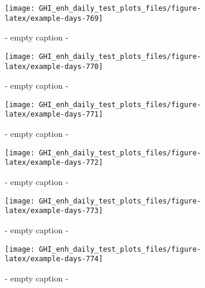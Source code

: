 \documentclass[
  10pt,
  a4paper,oneside]{article}
\begin{document}
\begin{figure}[H]

{\centering \texttt{[image: GHI\_enh\_daily\_test\_plots\_files/figure-latex/example-days-769]} 

}

\caption{ - empty caption - }\label{fig:example-days-769}
\end{figure}

\begin{figure}[H]

{\centering \texttt{[image: GHI\_enh\_daily\_test\_plots\_files/figure-latex/example-days-770]} 

}

\caption{ - empty caption - }\label{fig:example-days-770}
\end{figure}

\begin{figure}[H]

{\centering \texttt{[image: GHI\_enh\_daily\_test\_plots\_files/figure-latex/example-days-771]} 

}

\caption{ - empty caption - }\label{fig:example-days-771}
\end{figure}

\begin{figure}[H]

{\centering \texttt{[image: GHI\_enh\_daily\_test\_plots\_files/figure-latex/example-days-772]} 

}

\caption{ - empty caption - }\label{fig:example-days-772}
\end{figure}

\begin{figure}[H]

{\centering \texttt{[image: GHI\_enh\_daily\_test\_plots\_files/figure-latex/example-days-773]} 

}

\caption{ - empty caption - }\label{fig:example-days-773}
\end{figure}

\begin{figure}[H]

{\centering \texttt{[image: GHI\_enh\_daily\_test\_plots\_files/figure-latex/example-days-774]} 

}

\caption{ - empty caption - }\label{fig:example-days-774}
\end{figure}
\end{document}
